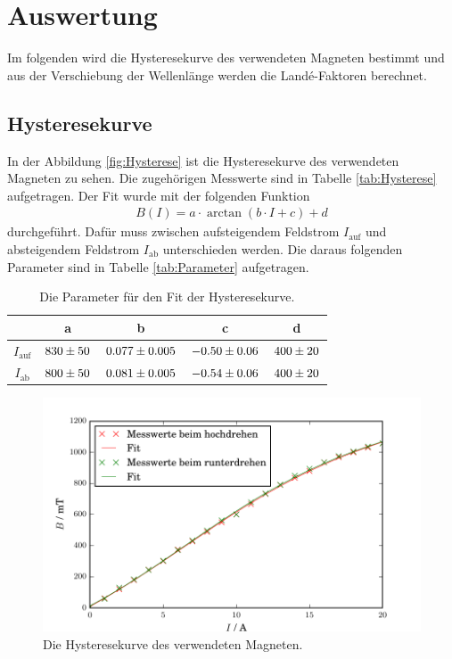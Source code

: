\newpage
\section{Auswertung}
\label{sec:Auswertung}
Im folgenden wird die Hysteresekurve des verwendeten Magneten bestimmt und aus der Verschiebung der Wellenlänge werden die Landé-Faktoren berechnet.



\subsection{Hysteresekurve}
In der Abbildung \eqref{fig:Hysterese} ist die Hysteresekurve des verwendeten Magneten zu sehen. Die zugehörigen Messwerte sind in Tabelle \eqref{tab:Hysterese} aufgetragen. Der Fit wurde mit der folgenden Funktion
\begin{align*}
  B(I) = a\cdot \arctan(b\cdot I + c) + d
\end{align*}
durchgeführt. Dafür muss zwischen aufsteigendem Feldstrom $I_\text{auf}$ und absteigendem Feldstrom $I_\text{ab}$ unterschieden werden. Die daraus folgenden Parameter sind in Tabelle \eqref{tab:Parameter} aufgetragen.

\begin{table}[H] %
  \centering
  \caption{Die Parameter für den Fit der Hysteresekurve.}
  \label{tab:Parameter}
  \begin{tabular}{c|c|c|c|c}
    & a & b & c & d \\
    \hline
    $I_\text{auf}$ & $\num{830 +- 50}$ & $\num{0.077 +- 0.005}$ & $\num{-0.50 +- 0.06}$ & $\num{400 +- 20}$ \\
    $I_\text{ab}$ & $\num{800 +- 50}$ & $\num{0.081 +- 0.005}$ & $\num{-0.54 +- 0.06}$ & $\num{400 +- 20}$ \\
  \end{tabular}
\end{table}

\begin{figure}[H] %
  \centering
  \includegraphics[width=\linewidth]{Bilder/Hysterese.pdf}
  \caption{Die Hysteresekurve des verwendeten Magneten.}
  \label{fig:Hysterese}
\end{figure}

